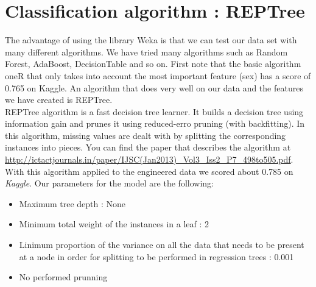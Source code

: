 \documentclass[11pt,a4paper,portrait]{article}
\begin{document}
\section{Classification algorithm : REPTree}
The advantage of using the library Weka is that we can test our data set with many different algorithms. We have tried many algorithms such as Random Forest, AdaBoost, DecisionTable and so on. First note that the basic algorithm oneR that only takes into account the most important feature (sex) has a score of 0.765 on Kaggle.  An algorithm that does very well on our data and the features we have created is REPTree.\\
REPTree algorithm is a fast decision tree learner. It builds a decision tree using information gain and prunes it using reduced-erro pruning (with backfitting). In this algorithm, missing values are dealt with by splitting the corresponding instances into pieces. You can find the paper that describes the algorithm at \url{http://ictactjournals.in/paper/IJSC(Jan2013)_Vol3_Iss2_P7_498to505.pdf}.\\
With this algorithm applied to the engineered data we scored about 0.785 on \textit{Kaggle}. Our parameters for the model are the following:
\begin{itemize}
	\item Maximum tree depth : None
	\item Minimum total weight of the instances in a leaf : 2
	\item Linimum proportion of the variance on all the data that needs to be present at a node in order for splitting to be performed in regression trees : 0.001
	\item No performed prunning
\end{itemize}
\end{document}
